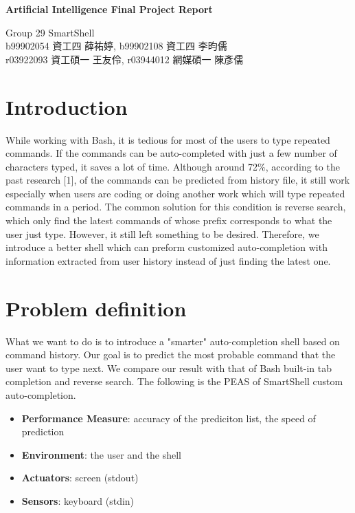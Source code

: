 \documentclass[11pt,a4paper]{article}
\begin{document}

\begin{center}
\textbf{\Large Artificial Intelligence Final Project Report}\\[1em]
\begin{CJK}{UTF8}{bsmi}
{\Large Group 29 SmartShell}\\[1em]
{\large b99902054 資工四 薛祐婷, }
{\large b99902108 資工四 李昀儒 }\\[1em]
{\large r03922093 資工碩一 王友伶, }
{\large r03944012 網媒碩一 陳彥儒 }\\[1em]
\end{CJK}
\end{center}
\section*{Introduction}
While working with Bash, it is tedious for most of the users to type repeated commands. 
If the commands can be auto-completed with just a few number of characters typed, it saves a lot of time. 
Although around 72\%, according to the past research [1], of the commands can be predicted from history file, 
it still work especially when users are coding or doing another work which will type repeated commands in a period. 
The common solution for this condition is reverse search, 
which only find the latest commands of whose prefix corresponds to what the user just type. 
However, it still left something to be desired. 
Therefore, we introduce a better shell which can preform customized auto-completion with information extracted from user history instead of just finding the latest one.

\section*{Problem definition}
What we want to do is to introduce a "smarter" auto-completion shell based on command history.
Our goal is to predict the most probable command that the user want to type next. 
We compare our result with that of Bash built-in tab completion and reverse search. 
The following is the PEAS of SmartShell custom auto-completion.

\begin{itemize}
\item {\bf Performance Measure}: accuracy of the prediciton list, the speed of prediction
\item {\bf Environment}: the user and the shell
\item {\bf Actuators}: screen (stdout)
\item {\bf Sensors}: keyboard (stdin)
\end{itemize}
\end{document}

